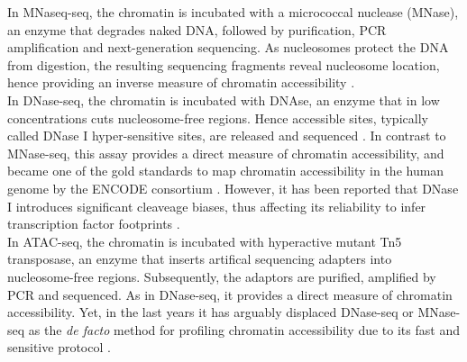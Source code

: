 In MNaseq-seq, the chromatin is incubated with a micrococcal nuclease (MNase), an enzyme that degrades naked DNA, followed by purification, PCR amplification and next-generation sequencing. As nucleosomes protect the DNA from digestion, the resulting sequencing fragments reveal nucleosome location, hence providing an inverse measure of chromatin accessibility \cite{Kaplan2008}.\\

In DNase-seq, the chromatin is incubated with DNAse, an enzyme that in low concentrations cuts nucleosome-free regions. Hence accessible sites, typically called DNase I hyper-sensitive sites, are released and sequenced \cite{Song2010}. In contrast to MNase-seq, this assay provides a direct measure of chromatin accessibility, and became one of the gold standards to map chromatin accessibility in the human genome by the ENCODE consortium \cite{ENCODE2012,Thurman2012}. However, it has been reported that DNase I introduces significant cleaveage biases, thus affecting its reliability to infer transcription factor footprints \cite{XX}.\\

In ATAC-seq, the chromatin is incubated with hyperactive mutant Tn5 transposase, an enzyme that inserts artifical sequencing adapters into nucleosome-free regions. Subsequently, the adaptors are purified, amplified by PCR  and sequenced. As in DNase-seq, it provides a direct measure of chromatin accessibility. Yet, in the last years it has arguably displaced DNase-seq or MNase-seq as the \textit{de facto} method for profiling chromatin accessibility due to its fast and sensitive protocol \cite{Buenrostro2015b,Tsompana2014,Nordstrom2019}.\\

